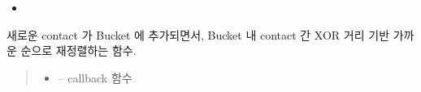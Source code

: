 \documentclass[a4paper,10pt,english]{sphinxmanual}
\begin{document}
\begin{fulllineitems}
\begin{fulllineitems}
\nopagebreak

\begin{itemize}
\item {} 
\sphinxAtStartPar
{\hyperref[\detokenize{_kademlia:KNode._onStore}]{}}

\end{itemize}



\end{fulllineitems}


\begin{fulllineitems}
\label{\detokenize{_kademlia:KNode._refreshBucket}}
\pysigstartsignatures
{}
\pysigstopsignatures
\sphinxAtStartPar
새로운 contact 가 Bucket 에 추가되면서, Bucket 내 contact 간 XOR 거리 기반 가까운 순으로 재정렬하는 함수.
\begin{quote}\begin{description}
\begin{itemize}
\item {} 
\sphinxAtStartPar
{} – callback 함수

\end{itemize}

\end{description}\end{quote}

\end{fulllineitems}



\end{fulllineitems}
\end{document}

